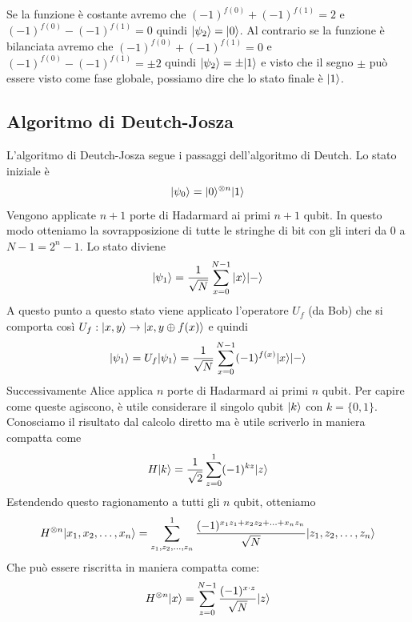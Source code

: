 \documentclass[12pt, a4paper]{report}
\begin{document}
Se la funzione è costante avremo che $(-1)^{f(0)}+(-1)^{f(1)}=2$ e $(-1)^{f(0)}-(-1)^{f(1)}=0$ quindi $| \psi_{2} \rangle=| 0 \rangle$. Al contrario se la funzione è bilanciata avremo che $(-1)^{f(0)}+(-1)^{f(1)}=0$ e $(-1)^{f(0)}-(-1)^{f(1)}=\pm2$ quindi $| \psi_{2} \rangle=\pm| 1 \rangle$ e visto che il segno $\pm$ può essere visto come fase globale, possiamo dire che lo stato finale è $| 1 \rangle$.
\subsection{Algoritmo di Deutch-Josza}
L'algoritmo di Deutch-Josza segue i passaggi dell'algoritmo di Deutch. Lo stato iniziale è
\begin{equation*}
    | \psi_{0} \rangle = | 0 \rangle^{\otimes n}| 1 \rangle
\end{equation*}
Vengono applicate $n+1$ porte di Hadarmard ai primi $n+1$ qubit. In questo modo otteniamo la sovrapposizione di tutte le stringhe di bit con gli interi da 0 a $N-1 = 2^{n}-1$. Lo stato diviene
\begin{equation*}
    | \psi_{1} \rangle = \frac{1}{\sqrt{N}}\sum_{x=0}^{N-1}| x \rangle| - \rangle
\end{equation*} 
A questo punto a questo stato viene applicato l'operatore $U_{f}$ (da Bob) che si comporta così $U_{f}:| x,y \rangle\rightarrow| x,y\oplus f(x) \rangle$  e quindi
\begin{equation*}
    | \psi_{1} \rangle=U_{f}| \psi_{1} \rangle = \frac{1}{\sqrt{N}}\sum_{x=0}^{N-1}(-1)^{f(x)}| x \rangle| - \rangle
\end{equation*}
Successivamente Alice applica $n$ porte di Hadarmard ai primi $n$ qubit. Per capire come queste agiscono, è utile considerare il singolo qubit $| k \rangle$ con $k=\{0,1\}$. Conosciamo il risultato dal calcolo diretto ma è utile scriverlo in maniera compatta come
\begin{equation*}
    H| k \rangle = \frac{1}{\sqrt{2}}\sum_{z=0}^{1}(-1)^{kz}| z \rangle
\end{equation*}
Estendendo questo ragionamento a tutti gli $n$ qubit, otteniamo
\begin{equation*}
    H^{\otimes n}| x_{1},x_{2},\ldots,x_{n} \rangle = \sum_{z_{1},z_{2},\ldots,z_{n}}^{1}\frac{(-1)^{x_{1}z_{1}+x_{2}z_{2}+\ldots+x_{n}z_{n}}}{\sqrt{N}}| z_{1},z_{2},\ldots,z_{n} \rangle
\end{equation*}
Che può essere riscritta in maniera compatta come:
\begin{equation*}
    H^{\otimes n}| x \rangle = \sum_{z=0}^{N-1}\frac{(-1)^{x\cdot z}}{\sqrt{N}}| z \rangle
\end{equation*}
\end{document}
